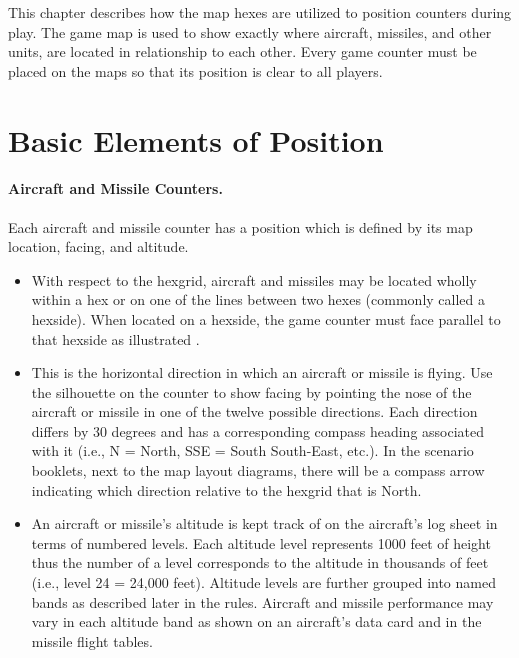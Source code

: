 

This chapter describes how the map hexes are utilized to position counters during play. The game map is used to show exactly where aircraft, missiles, and other units, are located in relationship to each other. Every game counter must be placed on the maps so that its position is clear to all players.


\section{Basic Elements of Position}
\label{rule:position}

\paragraph{Aircraft and Missile Counters.} 
Each aircraft and missile counter has a position which is defined by its map location, facing, and altitude.

\begin{itemize}
    \item {} With respect to the hexgrid, aircraft and missiles may be located wholly within a hex or on one of the lines between two hexes (commonly called a hexside). When located on a hexside, the game counter must face parallel to that hexside as illustrated . 

    \item {} This is the horizontal direction in which an aircraft or missile is flying. Use the silhouette on the counter to show facing by pointing the nose of the aircraft or missile in one of the twelve possible directions. Each direction differs by 30 degrees and has a corresponding compass heading associated with it (i.e., N = North, SSE = South South-East, etc.). In the scenario booklets, next to the map layout diagrams, there will be a compass arrow indicating which direction relative to the hexgrid that is North. 

    \item {} 
    An aircraft or missile's altitude is kept track of on the aircraft's log sheet in terms of numbered levels. Each altitude level represents 1000 feet of height thus the number of a level corresponds to the altitude in thousands of feet (i.e., level 24 = 24,000 feet). Altitude levels are further grouped into named bands as described later in the rules. Aircraft and missile performance may vary in each altitude band as shown on an aircraft's data card and in the missile flight tables.

\end{itemize}


